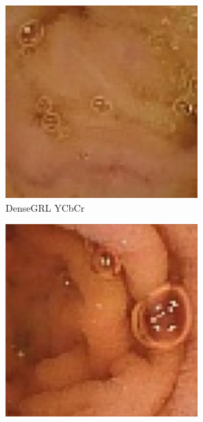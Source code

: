 \begin{figure}[H]
  \begin{subfigure}[b]{0.32\textwidth}
    \includegraphics[width=\textwidth]{Chapter7/Ycbcr_cycle_dense_9.jpg}
    \caption{DenseGRL YCbCr}
  \end{subfigure}
  \begin{subfigure}[b]{0.32\textwidth}
    \includegraphics[width=\textwidth]{Chapter7/Ycbcr_cycle_dense_445.jpg}

\end{subfigure}
\end{figure}
